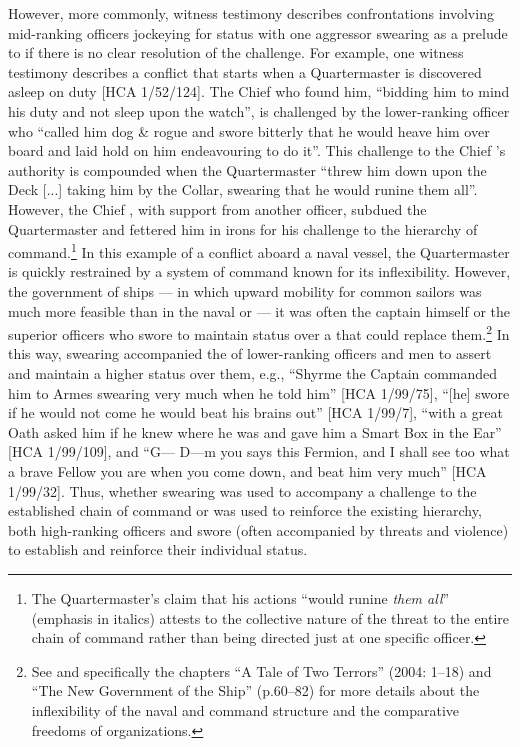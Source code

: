 However, more commonly, witness testimony describes confrontations involving mid-ranking officers jockeying for status with one aggressor swearing as a prelude to  if there is no clear resolution of the challenge. For example, one witness testimony describes a conflict that starts when a Quartermaster is discovered asleep on duty [HCA 1/52/124]. The Chief  who found him, “bidding him to mind his duty and not sleep upon the watch”, is challenged by the lower-ranking officer who “called him dog \& rogue and swore bitterly that he would heave him over board and laid hold on him endeavouring to do it”. This challenge to the Chief ’s authority is compounded when the Quartermaster “threw him down upon the Deck [...] taking him by the Collar, swearing that he would runine them all”. However, the Chief , with support from another officer, subdued the Quartermaster and fettered him in irons for his challenge to the hierarchy of command.\footnote{The Quartermaster’s claim that his actions “would runine \textit{them all}” (emphasis in italics) attests to the collective nature of the threat to the entire chain of command rather than being directed just at one specific officer.}  In this example of a conflict aboard a naval vessel, the Quartermaster is quickly restrained by a system of command known for its inflexibility. However, the government of  ships — in which upward mobility for common sailors was much more feasible than in the naval or  — it was often the captain himself or the superior officers who swore to maintain status over a  that could replace them.\footnote{See \citeauthor{Rediker2004} and specifically the chapters “A Tale of Two Terrors” (2004: 1–18) and “The New Government of the Ship” (p.60–82) for more details about the inflexibility of the naval and  command structure and the comparative freedoms of  organizations.}  In this way, swearing accompanied the  of lower-ranking officers and men to assert and maintain a higher status over them, e.g., “Shyrme the Captain commanded him to Armes swearing very much when he told him” [HCA 1/99/75], “[he] swore if he would not come he would beat his brains out” [HCA 1/99/7], “with a great Oath asked him if he knew where he was and gave him a Smart Box in the Ear” [HCA 1/99/109], and “G— D—m you says this Fermion, and I shall see too what a brave Fellow you are when you come down, and beat him very much” [HCA 1/99/32]. Thus, whether swearing was used to accompany a challenge to the established chain of command or was used to reinforce the {existing} {hierarchy, both high-ranking officers and  swore (often accompanied by threats and violence) to} establish and reinforce their individual status.

